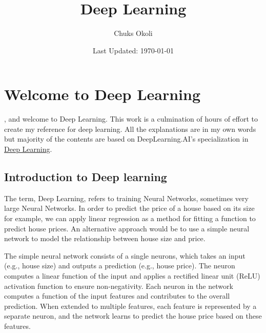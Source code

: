 \documentclass[letterpaper,12pt,notitlepage,twoside]{report}
\title{Deep Learning}
\author{Chuks Okoli}
\date{\footnotesize Last Updated: \today}
\makeatletter
\newcommand{\booktopic}{Deep Learning}
\newcommand*{\toccontents}{\@starttoc{toc}}
\makeatother
\begin{document}
\begin{titlepage}
  \pagestyle{plain}
  \maketitle
  \setcounter{tocdepth}{2}

  \toccontents
\end{titlepage}

\chapter{Welcome to Deep Learning} \label{ch:1}

, and welcome to \booktopic. This work is a culmination of hours of effort to create my reference for deep learning. All the explanations are in my own words but majority of the contents are based on DeepLearning.AI's specialization in \href{https://www.deeplearning.ai/courses/deep-learning-specialization/}{Deep Learning}.


\section{Introduction to Deep learning}
The term, Deep Learning, refers to training Neural Networks, sometimes very large Neural Networks.  In order to predict the price of a house based on its size for example, we can apply linear regression as a method for fitting a function to predict house prices. An alternative approach would be to use a simple neural network to model the relationship between house size and price. 

The simple neural network consists of a single neurons, which takes an input (e.g., house size) and outputs a prediction (e.g., house price). The neuron computes a linear function of the input and applies a rectified linear unit (ReLU) activation function to ensure non-negativity. Each neuron in the network computes a function of the input features and contributes to the overall prediction. When extended to multiple features, each feature is represented by a separate neuron, and the network learns to predict the house price based on these features.
\end{document}
